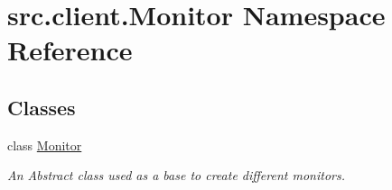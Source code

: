 \hypertarget{namespacesrc_1_1client_1_1_monitor}{\section{src.\-client.\-Monitor Namespace Reference}
\label{namespacesrc_1_1client_1_1_monitor}
}
\subsection*{Classes}
\begin{DoxyCompactItemize}
\item 
class \hyperlink{classsrc_1_1client_1_1_monitor_1_1_monitor}{Monitor}
\begin{DoxyCompactList}\small\item\em An Abstract class used as a base to create different monitors. \end{DoxyCompactList}\end{DoxyCompactItemize}
